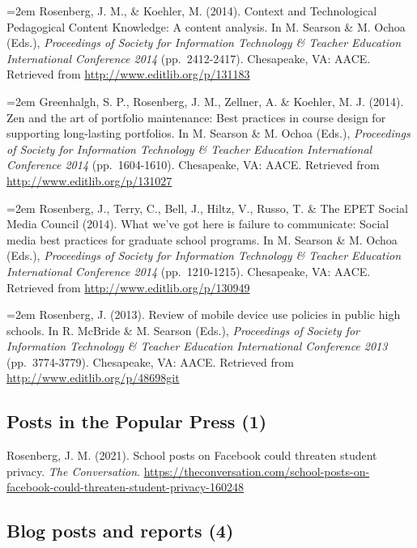 \documentclass[
  14,
]{article}
\begin{document}
\hangindent=2em Rosenberg, J. M., \& Koehler, M. (2014). Context and
Technological Pedagogical Content Knowledge: A content analysis. In M.
Searson \& M. Ochoa (Eds.), \emph{Proceedings of Society for Information
Technology \& Teacher Education International Conference 2014}
(pp.~2412-2417). Chesapeake, VA: AACE. Retrieved from
\url{http://www.editlib.org/p/131183}

\hangindent=2em Greenhalgh, S. P., Rosenberg, J. M., Zellner, A. \&
Koehler, M. J. (2014). Zen and the art of portfolio maintenance: Best
practices in course design for supporting long-lasting portfolios. In M.
Searson \& M. Ochoa (Eds.), \emph{Proceedings of Society for Information
Technology \& Teacher Education International Conference 2014}
(pp.~1604-1610). Chesapeake, VA: AACE. Retrieved from
\url{http://www.editlib.org/p/131027}

\hangindent=2em Rosenberg, J., Terry, C., Bell, J., Hiltz, V., Russo, T.
\& The EPET Social Media Council (2014). What we've got here is failure
to communicate: Social media best practices for graduate school
programs. In M. Searson \& M. Ochoa (Eds.), \emph{Proceedings of Society
for Information Technology \& Teacher Education International Conference
2014} (pp.~1210-1215). Chesapeake, VA: AACE. Retrieved from
\url{http://www.editlib.org/p/130949}

\hangindent=2em Rosenberg, J. (2013). Review of mobile device use
policies in public high schools. In R. McBride \& M. Searson (Eds.),
\emph{Proceedings of Society for Information Technology \& Teacher
Education International Conference 2013} (pp.~3774-3779). Chesapeake,
VA: AACE. Retrieved from \url{http://www.editlib.org/p/48698git}

\hypertarget{posts-in-the-popular-press-1}{%
\subsection{Posts in the Popular Press
(1)}\label{posts-in-the-popular-press-1}}

Rosenberg, J. M. (2021). School posts on Facebook could threaten student
privacy. \emph{The Conversation}.
\url{https://theconversation.com/school-posts-on-facebook-could-threaten-student-privacy-160248}

\hypertarget{blog-posts-and-reports-4}{%
\subsection{Blog posts and reports (4)}\label{blog-posts-and-reports-4}}
\end{document}
